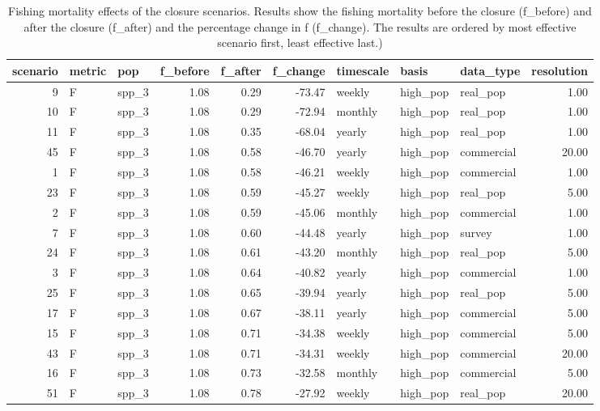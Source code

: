 \begin{longtable}{rllrrrlllr}
\caption{Fishing mortality effects of the closure scenarios. Results show the
	fishing mortality before the closure (f\_before) and after the closure
	(f\_after) and the percentage change in f (f\_change). The results are
	ordered by most effective scenario first, least effective last.)} \\ 
  \hline
scenario & metric & pop & f\_before & f\_after & f\_change & timescale & basis & data\_type & resolution \\ 
  \hline
  9 & F & spp\_3 & 1.08 & 0.29 & -73.47 & weekly & high\_pop & real\_pop & 1.00 \\ 
   10 & F & spp\_3 & 1.08 & 0.29 & -72.94 & monthly & high\_pop & real\_pop & 1.00 \\ 
   11 & F & spp\_3 & 1.08 & 0.35 & -68.04 & yearly & high\_pop & real\_pop & 1.00 \\ 
   45 & F & spp\_3 & 1.08 & 0.58 & -46.70 & yearly & high\_pop & commercial & 20.00 \\ 
    1 & F & spp\_3 & 1.08 & 0.58 & -46.21 & weekly & high\_pop & commercial & 1.00 \\ 
   23 & F & spp\_3 & 1.08 & 0.59 & -45.27 & weekly & high\_pop & real\_pop & 5.00 \\ 
    2 & F & spp\_3 & 1.08 & 0.59 & -45.06 & monthly & high\_pop & commercial & 1.00 \\ 
    7 & F & spp\_3 & 1.08 & 0.60 & -44.48 & yearly & high\_pop & survey & 1.00 \\ 
   24 & F & spp\_3 & 1.08 & 0.61 & -43.20 & monthly & high\_pop & real\_pop & 5.00 \\ 
    3 & F & spp\_3 & 1.08 & 0.64 & -40.82 & yearly & high\_pop & commercial & 1.00 \\ 
   25 & F & spp\_3 & 1.08 & 0.65 & -39.94 & yearly & high\_pop & real\_pop & 5.00 \\ 
   17 & F & spp\_3 & 1.08 & 0.67 & -38.11 & yearly & high\_pop & commercial & 5.00 \\ 
   15 & F & spp\_3 & 1.08 & 0.71 & -34.38 & weekly & high\_pop & commercial & 5.00 \\ 
   43 & F & spp\_3 & 1.08 & 0.71 & -34.31 & weekly & high\_pop & commercial & 20.00 \\ 
   16 & F & spp\_3 & 1.08 & 0.73 & -32.58 & monthly & high\_pop & commercial & 5.00 \\ 
   51 & F & spp\_3 & 1.08 & 0.78 & -27.92 & weekly & high\_pop & real\_pop & 20.00 \\ 

\end{longtable}
